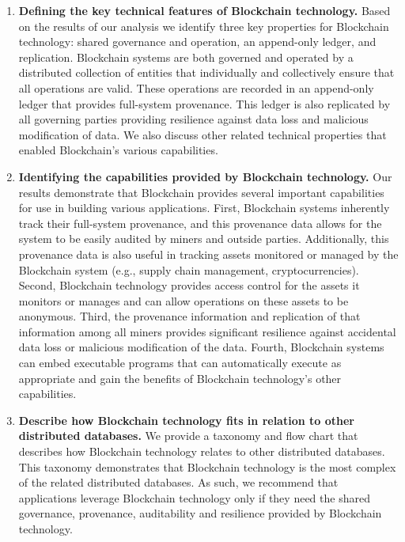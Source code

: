 \begin{enumerate}
	\item \textbf{Defining the key technical features of Blockchain technology.}
	Based on the results of our analysis we identify three key properties for Blockchain technology: shared governance and operation, an append-only ledger, and replication.
	Blockchain systems are both governed and operated by a distributed collection of entities that individually and collectively ensure that all operations are valid.
	These operations are recorded in an append-only ledger that provides full-system provenance.
	This ledger is also replicated by all governing parties providing resilience against data loss and malicious modification of data.
	We also discuss other related technical properties that enabled Blockchain's various capabilities.
	
	\item \textbf{Identifying the capabilities provided by Blockchain technology.}
	Our results demonstrate that Blockchain provides several important capabilities for use in building various applications.
	First, Blockchain systems inherently track their full-system provenance, and this provenance data allows for the system to be easily audited by miners and outside parties.
	Additionally, this provenance data is also useful in tracking assets monitored or managed by the Blockchain system (e.g., supply chain management, cryptocurrencies).
	Second, Blockchain technology provides access control for the assets it monitors or manages and can allow operations on these assets to be anonymous.
	Third, the provenance information and replication of that information among all miners provides significant resilience against accidental data loss or malicious modification of the data.
	Fourth, Blockchain systems can embed executable programs that can automatically execute as appropriate and gain the benefits of Blockchain technology's other capabilities.
		
	\item \textbf{Describe how Blockchain technology fits in relation to other distributed databases.}
	We provide a taxonomy and flow chart that describes how Blockchain technology relates to other distributed databases.
	This taxonomy demonstrates that Blockchain technology is the most complex of the related distributed databases.
	As such, we recommend that applications leverage Blockchain technology only if they need the shared governance, provenance, auditability and resilience provided by Blockchain technology.
	

\end{enumerate}
